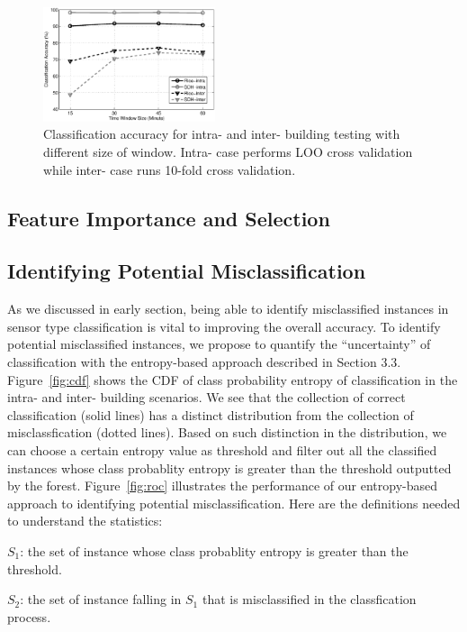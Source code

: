 \begin{figure}[h!]
\centering
	\includegraphics[width=0.45\textwidth]{./fig/window.eps}
\caption{Classification accuracy for intra- and inter- building testing with different size of window. Intra- case performs LOO cross validation while inter- case runs 10-fold cross validation.}
\label{fig:window}
\end{figure}

\subsection{Feature Importance and Selection}


\subsection{Identifying Potential Misclassification}
As we discussed in early section, being able to identify misclassified instances in sensor type classification is vital to improving the overall accuracy. To identify potential misclassified instances, we propose to quantify the ``uncertainty'' of classification with the entropy-based approach described in Section 3.3. Figure~\ref{fig:cdf} shows the CDF of class probability entropy of classification in the intra- and inter- building scenarios. We see that the collection of correct
classification (solid lines) has a distinct distribution from the collection of misclassfication (dotted lines). Based on such distinction in the distribution, we can choose a certain entropy value as threshold and filter out all the classified instances whose class probablity entropy is greater than the threshold outputted by the forest. Figure~\ref{fig:roc} illustrates the performance of our entropy-based approach to identifying potential misclassification. Here are the definitions needed to understand the statistics:

$S_{1}$: the set of instance whose class probablity entropy is greater than the threshold.

$S_{2}$: the set of instance falling in $S_{1}$ that is misclassified in the classfication process.

